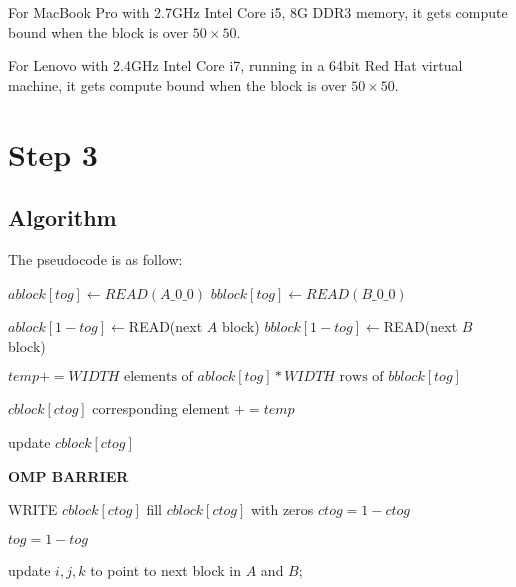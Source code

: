 \documentclass[12pt]{article}
\newcommand{\0}{\mathbf{0}}
\begin{document}
For MacBook Pro with 2.7GHz Intel Core i5, 8G DDR3 memory, it gets compute bound when the block is over $50\times 50$.

For Lenovo with 2.4GHz Intel Core i7, running in a 64bit Red Hat virtual machine, it gets compute bound when the block is over $50\times 50$.

\section{Step 3}

\subsection{Algorithm}

The pseudocode is as follow:
\newpage
\begin{algorithmic}
    \State $ablock[tog] \gets READ(A\_0\_0)$ 
    \State $bblock[tog] \gets READ(B\_0\_0)$	

    \State $ablock[1-tog] \gets $READ(next $A$ block)
    \State $bblock[1-tog] \gets $READ(next $B$ block)

    \State $temp += WIDTH \text{ elements of }ablock[tog] * WIDTH\text{ rows of }bblock[tog]$

    \State $cblock[ctog]$ corresponding element $+= temp$
    \EndFor
    \EndFor

    \State update $cblock[ctog]$
    \EndFor
    \EndIf

    \textbf{OMP BARRIER}

    \State WRITE $cblock[ctog]$
    \State fill $cblock[ctog]$ with zeros
    \State $ctog = 1 - ctog$
    \EndIf

    \State $tog = 1 - tog$

    \State update $i, j, k$ to point to next block in $A$ and $B$;
    \EndWhile


\end{algorithmic}
\end{document}
